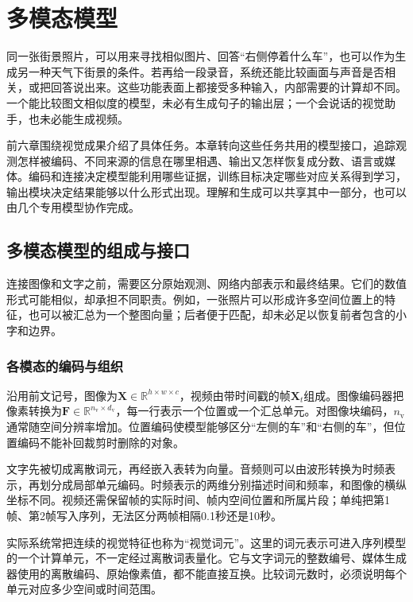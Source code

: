 \chapter{多模态模型}
\label{chap:vision-multimodal-models}

同一张街景照片，可以用来寻找相似图片、回答“右侧停着什么车”，也可以作为生成另一种天气下街景的条件。若再给一段录音，系统还能比较画面与声音是否相关，或把回答说出来。这些功能表面上都接受多种输入，内部需要的计算却不同。一个能比较图文相似度的模型，未必有生成句子的输出层；一个会说话的视觉助手，也未必能生成视频。

前六章围绕视觉成果介绍了具体任务。本章转向这些任务共用的模型接口，追踪观测怎样被编码、不同来源的信息在哪里相遇、输出又怎样恢复成分数、语言或媒体。编码和连接决定模型能利用哪些证据，训练目标决定哪些对应关系得到学习，输出模块决定结果能够以什么形式出现。理解和生成可以共享其中一部分，也可以由几个专用模型协作完成。

\section{多模态模型的组成与接口}
\label{sec:vision-models-interfaces}

连接图像和文字之前，需要区分原始观测、网络内部表示和最终结果。它们的数值形式可能相似，却承担不同职责。例如，一张照片可以形成许多空间位置上的特征，也可以被汇总为一个整图向量；后者便于匹配，却未必足以恢复前者包含的小字和边界。

\subsection{各模态的编码与组织}
\label{sec:vision-models-encoding}

沿用前文记号，图像为$\bm{X}\in\mathbb{R}^{h\times w\times c}$，视频由带时间戳的帧$\bm{X}_t$组成。图像编码器把像素转换为$\bm{F}\in\mathbb{R}^{n_{\mathrm v}\times d_{\mathrm v}}$，每一行表示一个位置或一个汇总单元。对图像块编码，$n_{\mathrm v}$通常随空间分辨率增加。位置编码使模型能够区分“左侧的车”和“右侧的车”，但位置编码不能补回裁剪时删除的对象。

文字先被切成离散词元，再经嵌入表转为向量。音频则可以由波形转换为时频表示，再划分成局部单元编码。时频表示的两维分别描述时间和频率，和图像的横纵坐标不同。视频还需保留帧的实际时间、帧内空间位置和所属片段；单纯把第1帧、第2帧写入序列，无法区分两帧相隔0.1秒还是10秒。

实际系统常把连续的视觉特征也称为“视觉词元”。这里的词元表示可进入序列模型的一个计算单元，不一定经过离散词表量化。它与文字词元的整数编号、媒体生成器使用的离散编码、原始像素值，都不能直接互换。比较词元数时，必须说明每个单元对应多少空间或时间范围。

